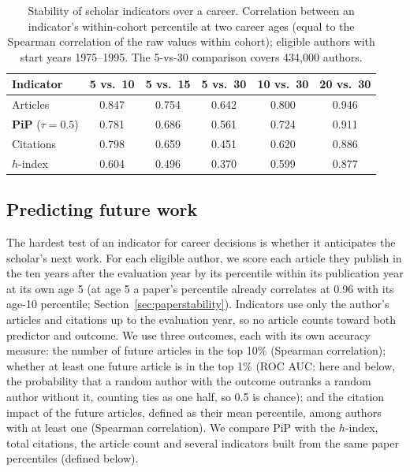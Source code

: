 \documentclass[11pt]{article}
\begin{document}
\begin{table}[t]
  \centering
  \small
  \caption{Stability of scholar indicators over a career. Correlation between an indicator's within-cohort percentile
  at two career ages (equal to the Spearman correlation of the raw values within cohort); eligible authors with start
  years 1975--1995. The 5-vs-30 comparison covers 434,000 authors.}
  \label{tab:careerstability}
  \begin{tabular}{lccccc}
    \toprule
    Indicator & 5 vs.\ 10 & 5 vs.\ 15 & 5 vs.\ 30 & 10 vs.\ 30 & 20 vs.\ 30 \\
    \midrule
    Articles & 0.847 & 0.754 & 0.642 & 0.800 & 0.946 \\
    \textbf{PiP} ($\tau = 0.5$) & 0.781 & 0.686 & 0.561 & 0.724 & 0.911 \\
    Citations & 0.798 & 0.659 & 0.451 & 0.620 & 0.886 \\
    $h$-index & 0.604 & 0.496 & 0.370 & 0.599 & 0.877 \\
    \bottomrule
  \end{tabular}
\end{table}
\subsection{Predicting future work}
\label{sec:prediction}

The hardest test of an indicator for career decisions is whether it anticipates the scholar's next work. For each
eligible author, we score each article they publish in the ten years after the evaluation year by its percentile within
its publication year at its own age 5 (at age 5 a paper's percentile already correlates at 0.96 with its age-10
percentile; Section~\ref{sec:paperstability}). Indicators use only the author's articles and citations up to the
evaluation year, so no article counts toward both predictor and outcome. We use three outcomes, each with its own
accuracy measure: the number of future articles in the top 10\% (Spearman correlation); whether at least one future
article is in the top 1\% (ROC AUC: here and below, the probability that a random author with the outcome outranks a
random author without it, counting ties as one half, so 0.5 is chance); and the citation impact of the future
articles, defined as their mean percentile, among authors with at least one (Spearman correlation). We compare PiP with
the $h$-index, total citations, the article count and several indicators built from the same paper percentiles
(defined below).
\end{document}
